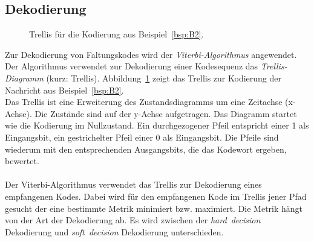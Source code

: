 \subsection{Dekodierung}
\label{kapitel:grundlagen_dekodierung}
\begin{figure}[t]
	\centering
		
\caption{Trellis für die Kodierung aus Beispiel~\ref{bsp:B2}.}
\label{abb:trellis_kodierung}
\end{figure}
Zur Dekodierung von Faltungskodes wird der \emph{Viterbi-Algorithmus} angewendet. Der Algorithmus verwendet zur Dekodierung einer Kodesequenz das \emph{Trellis-Diagramm} (kurz: Trellis). Abbildung~\ref{abb:trellis_kodierung} zeigt das Trellis zur Kodierung der Nachricht aus Beispiel~\ref{bsp:B2}.
\\
Das Trellis ist eine Erweiterung des Zustandsdiagramms um eine Zeitachse (x-Achse). Die Zustände sind auf der y-Achse aufgetragen. Das Diagramm startet wie die Kodierung im Nullzustand. Ein durchgezogener Pfeil entspricht einer 1 als Eingangsbit, ein gestrichelter Pfeil einer 0 als Eingangsbit. Die Pfeile sind wiederum mit den entsprechenden Ausgangsbits, die das Kodewort ergeben, bewertet.
\\
\\
Der Viterbi-Algorithmus verwendet das Trellis zur Dekodierung eines empfangenen Kodes. Dabei wird für den empfangenen Kode im Trellis jener Pfad gesucht der eine bestimmte Metrik minimiert bzw. maximiert. Die Metrik hängt von der Art der Dekodierung ab. Es wird zwischen der \emph{hard~decision} Dekodierung und \emph{soft~decision} Dekodierung unterschieden.

